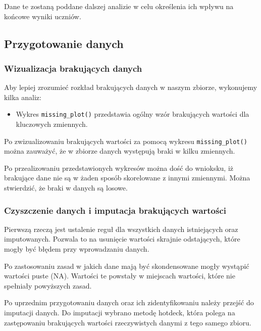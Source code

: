 \documentclass[
]{article}
\providecommand{\tightlist}{%
  \setlength{\itemsep}{0pt}\setlength{\parskip}{0pt}}
\begin{document}
Dane te zostaną poddane dalszej analizie w celu określenia ich wpływu na
końcowe wyniki uczniów.

\subsection{Przygotowanie danych}\label{przygotowanie-danych}

\subsubsection{Wizualizacja brakujących
danych}\label{wizualizacja-brakujux105cych-danych}

Aby lepiej zrozumieć rozkład brakujących danych w naszym zbiorze,
wykonujemy kilka analiz:

\begin{itemize}
\tightlist
\item
  Wykres \texttt{missing\_plot()} przedstawia ogólny wzór brakujących
  wartości dla kluczowych zmiennych.
\end{itemize}

Po zwizualizowaniu brakujących wartości za pomocą wykresu
\texttt{missing\_plot()} można zauważyć, że w zbiorze danych występują
braki w kilku zmiennych.

Po przealizowaniu przedstawionych wykresów można dość do wnioksku, iż
brakujące dane nie są w żaden sposób skorelowane z innymi zmiennymi.
Można stwierdzić, że braki w danych są losowe.

\subsubsection{Czyszczenie danych i imputacja brakujących
wartości}\label{czyszczenie-danych-i-imputacja-brakujux105cych-wartoux15bci}

Pierwszą rzeczą jest ustalenie reguł dla wszystkich danych istniejących
oraz imputowanych. Pozwala to na usunięcie wartości skrajnie
odstających, które mogły być błędem przy wprowadzaniu danych.

Po zastosowaniu zasad w jakich dane mają być skondensowane mogły
wystąpić wartości puste (NA). Wartości te powstały w miejscach wartości,
które nie spełniały powyższych zasad.

Po uprzednim przygotowaniu danych oraz ich zidentyfikowaniu należy
przejść do imputacji danych. Do imputacji wybrano metodę hotdeck, która
polega na zastępowaniu brakujących wartości rzeczywistych danymi z tego
samego zbioru.
\end{document}
